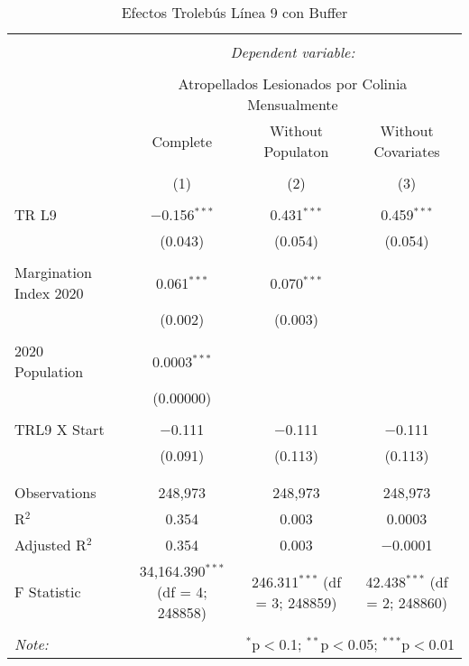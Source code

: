 
\begin{table}[!htbp] \centering 
  \caption{Efectos Trolebús Línea 9 con Buffer} 
  \label{} 
\begin{tabular}{@{\extracolsep{5pt}}lccc} 
\\[-1.8ex]\hline 
\hline \\[-1.8ex] 
 & \multicolumn{3}{c}{\textit{Dependent variable:}} \\ 
\cline{2-4} 
\\[-1.8ex] & \multicolumn{3}{c}{Atropellados Lesionados por Colinia Mensualmente} \\ 
 & Complete & Without Populaton & Without Covariates \\ 
\\[-1.8ex] & (1) & (2) & (3)\\ 
\hline \\[-1.8ex] 
 TR L9 & $-$0.156$^{***}$ & 0.431$^{***}$ & 0.459$^{***}$ \\ 
  & (0.043) & (0.054) & (0.054) \\ 
  & & & \\ 
 Margination Index 2020 & 0.061$^{***}$ & 0.070$^{***}$ &  \\ 
  & (0.002) & (0.003) &  \\ 
  & & & \\ 
 2020 Population & 0.0003$^{***}$ &  &  \\ 
  & (0.00000) &  &  \\ 
  & & & \\ 
 TRL9 X Start & $-$0.111 & $-$0.111 & $-$0.111 \\ 
  & (0.091) & (0.113) & (0.113) \\ 
  & & & \\ 
\hline \\[-1.8ex] 
Observations & 248,973 & 248,973 & 248,973 \\ 
R$^{2}$ & 0.354 & 0.003 & 0.0003 \\ 
Adjusted R$^{2}$ & 0.354 & 0.003 & $-$0.0001 \\ 
F Statistic & 34,164.390$^{***}$ (df = 4; 248858) & 246.311$^{***}$ (df = 3; 248859) & 42.438$^{***}$ (df = 2; 248860) \\ 
\hline 
\hline \\[-1.8ex] 
\textit{Note:}  & \multicolumn{3}{r}{$^{*}$p$<$0.1; $^{**}$p$<$0.05; $^{***}$p$<$0.01} \\ 
\end{tabular} 
\end{table} 
